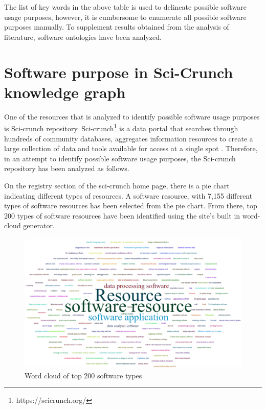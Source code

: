 The list of key words in the above table is used to delineate possible software usage purposes, however, it is cumbersome to enumerate all possible software purposes manually. To supplement results obtained from the analysis of literature, software ontologies have been analyzed. 

\section{Software purpose in Sci-Crunch knowledge graph  }

One of the resources that is analyzed to identify possible software usage purposes is Sci-crunch repository. Sci-crunch\footnote{https://scicrunch.org/} is a data portal that searches through hundreds of community databases, aggregates information resources to create a large collection of data and tools available for access at a single spot \citep{grethe2016scicrunch}. Therefore, in an attempt to identify possible software usage purposes, the Sci-crunch repository has been analyzed as follows. 

On the registry section of the sci-crunch home page, there is a pie chart indicating different types of resources. A software resource, with  7,155 different types of software resources has been selected from the pie chart. From there, top 200 types of software resources have been identified using the site’s built in word-cloud generator. 

\begin{figure}[htbp]
	\centering
	\includegraphics[width=1.2\textwidth]{4.graphics/figures/cloud}
	\caption{Word cloud of top 200 software types}
	\label{fig:chapter03:setup}
\end{figure}

